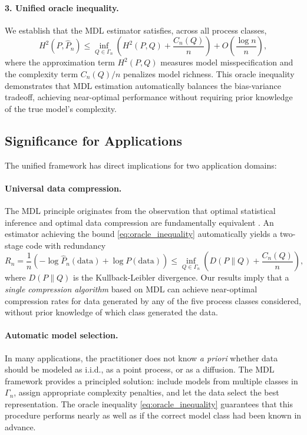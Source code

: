 \documentclass[preprint,review,12pt]{article}
\begin{document}
\paragraph{3. Unified oracle inequality.}
We establish that the MDL estimator satisfies, across all process classes,
\begin{equation}\label{eq:oracle_inequality}
	H^2(P, \hat{P}_n) \leq \inf_{Q \in \Gamma_n} \left( H^2(P, Q) 
	+ \frac{C_n(Q)}{n} \right) + O\left( \frac{\log n}{n} \right),
\end{equation}
where the approximation term $H^2(P, Q)$ measures model misspecification 
and the complexity term $C_n(Q)/n$ penalizes model richness. This oracle 
inequality demonstrates that MDL estimation automatically balances the 
bias-variance tradeoff, achieving near-optimal performance without requiring 
prior knowledge of the true model's complexity.

\subsection{Significance for Applications}

The unified framework has direct implications for two application domains:

\paragraph{Universal data compression.}
The MDL principle originates from the observation that optimal statistical 
inference and optimal data compression are fundamentally equivalent 
\citep{Rissanen1978, Cover2006}. An estimator achieving the bound 
\eqref{eq:oracle_inequality} automatically yields a two-stage code with 
redundancy
\[
R_n = \frac{1}{n}\left( -\log \hat{P}_n(\text{data}) + \log P(\text{data})
\right) \leq \inf_{Q \in \Gamma_n} \left( D(P \| Q) + \frac{C_n(Q)}{n}
\right),
\]
where $D(P \| Q)$ is the Kullback-Leibler divergence. Our results imply that 
a \emph{single compression algorithm} based on MDL can achieve near-optimal 
compression rates for data generated by any of the five process classes 
considered, without prior knowledge of which class generated the data.

\paragraph{Automatic model selection.}
In many applications, the practitioner does not know \emph{a priori} whether 
data should be modeled as i.i.d., as a point process, or as a diffusion. 
The MDL framework provides a principled solution: include models from 
multiple classes in $\Gamma_n$, assign appropriate complexity penalties, 
and let the data select the best representation. The oracle inequality 
\eqref{eq:oracle_inequality} guarantees that this procedure performs nearly 
as well as if the correct model class had been known in advance.
\end{document}
